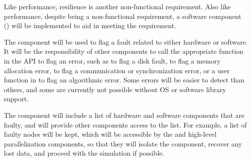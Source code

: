 \documentclass[10pt,twocolumn]{article}
\begin{document}
Like performance, resilience is another non-functional requirement.
Also like performance, despite being a non-functional requirement, a
software component () will be implemented to aid in
meeting the requirement.  

The  component will be used to flag a fault related to
either hardware or software.  It will be the responsibility of other
components to call the appropriate function in the  API to
flag an error, such as  to flag a disk fault, 
to flag a memory allocation error,  to flag a
communication or synchronization error, or a user function in
 to flag an algorithmic error.  Some errors will be easier
to detect than others, and some are currently not possible without
OS or software library support.

The  component will include a list of hardware and software
components that are faulty, and will provide other components access to
the list.  For example, a list of faulty nodes will be kept, which will
be accessible by the  and high-level parallelization components,
so that they will isolate the component, recover any lost data, and proceed
with the simulation if possible.

% 
% 
\end{document}
